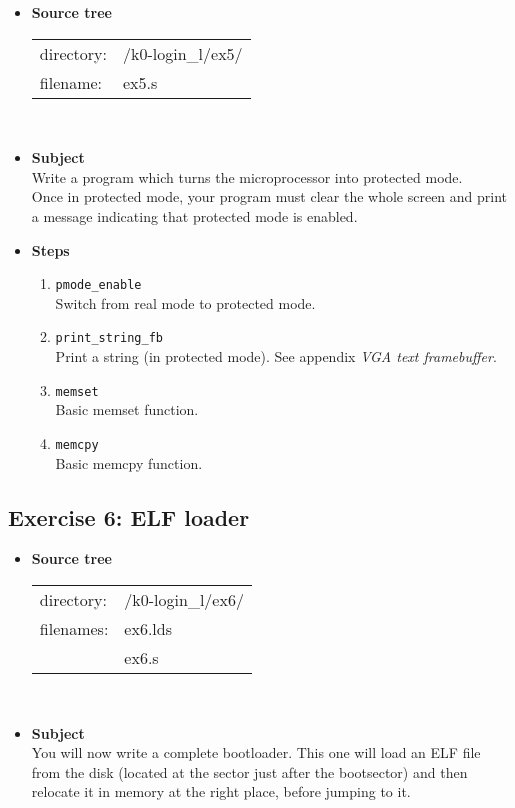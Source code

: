 {\begin{itemize}
\item {\bf Source tree}\\
\begin{tabular}{p{4cm}l}
directory: & /k0-login\_l/ex5/\\
filename: & ex5.s
\end{tabular}
\\
\item {\bf Subject}\\
Write a program which turns the microprocessor into protected mode.\\
Once in protected mode, your program must clear the whole screen and print a message
indicating that protected mode is enabled.
\item {\bf Steps}
  \begin{enumerate}
  \item {\tt pmode\_enable}\\
  Switch from real mode to protected mode.
  \item {\tt print\_string\_fb}\\
  Print a string (in protected mode). See appendix \emph{VGA text
  framebuffer}.
  \item {\tt memset}\\
  Basic memset function.
  \item {\tt memcpy}\\
  Basic memcpy function.
  \end{enumerate}
\end{itemize}

\newpage

\subsection*{Exercise 6: ELF loader}

\begin{itemize}
\item {\bf Source tree}\\
\begin{tabular}{p{4cm}l}
directory: & /k0-login\_l/ex6/\\
filenames: & ex6.lds\\
 & ex6.s
\end{tabular}
\\
\item {\bf Subject}\\
You will now write a complete bootloader. This one will load an ELF
file from the disk (located at the sector just after the bootsector)
and then relocate it in memory at the right place, before jumping to
it.


\end{itemize}}
